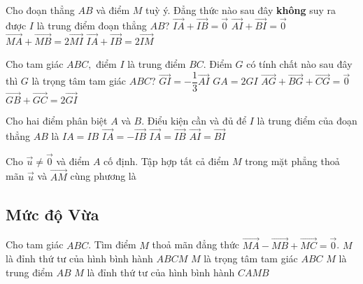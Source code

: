 \begin{ex}%
	Cho đoạn thẳng $AB$ và điểm $M$ tuỳ ý. Đẳng thức nào sau đây \textbf{không} suy ra được $I$ là trung điểm đoạn thẳng $AB$?
	\choice
	{$\vec{IA}+\vec{IB}=\vec{0}$}
	{$\vec{AI}+\vec{BI}=\vec{0}$}
	{$\vec{MA}+\vec{MB}=2\vec{MI}$}
	{\True $\vec{IA}+\vec{IB}=2\vec{IM}$}
\end{ex}

\begin{ex}%
	Cho tam giác $ABC,$ điểm $I$ là trung điểm $BC$. Điểm $G$ có tính chất nào sau đây thì $G$ là trọng tâm tam giác $ABC$?
	\choice
	{$\vec{GI}=-\dfrac{1}{3}\vec{AI}$}
	{$GA=2GI$}
	{\True $\vec{AG}+\vec{BG}+\vec{CG}=\vec{0}$}
	{$\vec{GB}+\vec{GC}=2\vec{GI}$}
\end{ex}

\begin{ex}%
	Cho hai điểm phân biệt $A$ và $B$. Điểu kiện cần và đủ để $I$ là trung điểm của đoạn thẳng $AB$ là
	\choice
	{$IA=IB$}
	{\True $\vec{IA}=-\vec{IB}$}
	{$\vec{IA}=\vec{IB}$}
	{$\vec{AI}=\vec{BI}$}
\end{ex}

\begin{ex}%
	Cho $\vec{u} \ne \vec{0}$ và điểm $A$ cố định. Tập hợp tất cả điểm $M$ trong mặt phẳng thoả mãn $\vec{u}$ và $\vec{AM}$ cùng phương là
\end{ex}

\subsection*{Mức độ Vừa}
\begin{ex}%
	Cho tam giác $ABC$. Tìm điểm $M$ thoả mãn đẳng thức $\vec{MA}-\vec{MB}+\vec{MC}=\vec{0}$.
	\choice
	{\True $M$ là đỉnh thứ tư của hình bình hành $ABCM$}
	{$M$ là trọng tâm tam giác $ABC$}
	{$M$ là trung điểm $AB$}
	{$M$ là đỉnh thứ tư của hình bình hành $CAMB$}
\end{ex}

